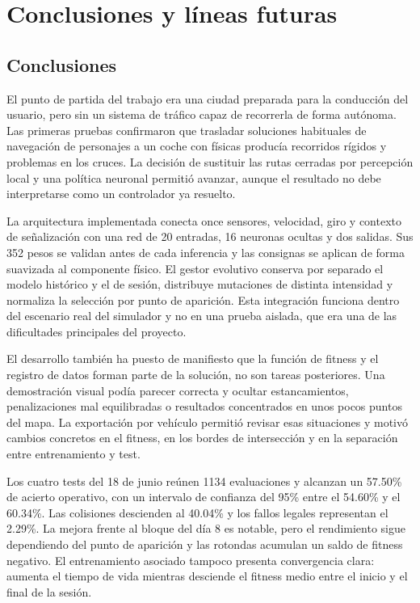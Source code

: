\chapter{Conclusiones y líneas futuras}

\section{Conclusiones}

El punto de partida del trabajo era una ciudad preparada para la conducción del usuario, pero sin un sistema de tráfico capaz de recorrerla de forma autónoma. Las primeras pruebas confirmaron que trasladar soluciones habituales de navegación de personajes a un coche con físicas producía recorridos rígidos y problemas en los cruces. La decisión de sustituir las rutas cerradas por percepción local y una política neuronal permitió avanzar, aunque el resultado no debe interpretarse como un controlador ya resuelto.

La arquitectura implementada conecta once sensores, velocidad, giro y contexto de señalización con una red de 20 entradas, 16 neuronas ocultas y dos salidas. Sus 352 pesos se validan antes de cada inferencia y las consignas se aplican de forma suavizada al componente físico. El gestor evolutivo conserva por separado el modelo histórico y el de sesión, distribuye mutaciones de distinta intensidad y normaliza la selección por punto de aparición. Esta integración funciona dentro del escenario real del simulador y no en una prueba aislada, que era una de las dificultades principales del proyecto.

El desarrollo también ha puesto de manifiesto que la función de fitness y el registro de datos forman parte de la solución, no son tareas posteriores. Una demostración visual podía parecer correcta y ocultar estancamientos, penalizaciones mal equilibradas o resultados concentrados en unos pocos puntos del mapa. La exportación por vehículo permitió revisar esas situaciones y motivó cambios concretos en el fitness, en los bordes de intersección y en la separación entre entrenamiento y test.

Los cuatro tests del 18 de junio reúnen 1134 evaluaciones y alcanzan un 57.50\% de acierto operativo, con un intervalo de confianza del 95\% entre el 54.60\% y el 60.34\%. Las colisiones descienden al 40.04\% y los fallos legales representan el 2.29\%. La mejora frente al bloque del día 8 es notable, pero el rendimiento sigue dependiendo del punto de aparición y las rotondas acumulan un saldo de fitness negativo. El entrenamiento asociado tampoco presenta convergencia clara: aumenta el tiempo de vida mientras desciende el fitness medio entre el inicio y el final de la sesión.

